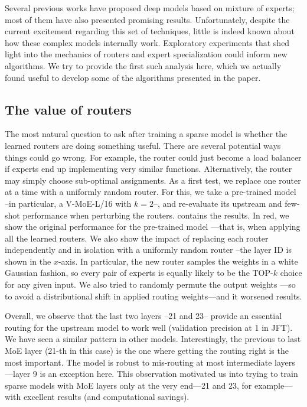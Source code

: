 \documentclass{article}
\newcommand{\abbv}{{V-MoE}}
\begin{document}
Several previous works have proposed deep models based on mixture of experts; most of them have also presented promising results.
Unfortunately, despite the current excitement regarding this set of techniques, little is indeed known about how these complex models internally work.
Exploratory experiments that shed light into the mechanics of routers and expert specialization could inform new algorithms.
We try to provide the first such analysis here, which we actually found useful to develop some of the algorithms presented in the paper.


\subsection{The value of routers}
\label{app_analysis_value_routers}
The most natural question to ask after training a sparse model is whether the learned routers are doing something useful.
There are several potential ways things could go wrong.
For example, the router could just become a load balancer if experts end up implementing very similar functions.
Alternatively, the router may simply choose sub-optimal assignments.
As a first test, we replace one router at a time with a uniformly random router.
For this, we take a pre-trained model --in particular, a \abbv{}-L/16 with $k=2$--, and re-evaluate its upstream and few-shot performance when perturbing the routers.
 contains the results.
In red, we show the original performance for the pre-trained model ---that is, when applying all the learned routers.
We also show the impact of replacing each router independently and in isolation with a uniformly random router --the layer ID is shown in the $x$-axis.
In particular, the new router samples the weights in a white Gaussian fashion, so every pair of experts is equally likely to be the TOP-$k$ choice for any given input. We also tried to randomly permute the output weights ---so to avoid a distributional shift in applied routing weights---and it worsened results.


Overall, we observe that the last two layers --21 and 23-- provide an essential routing for the upstream model to work well (validation precision at 1 in JFT).
We have seen a similar pattern in other models.
Interestingly, the previous to last MoE layer (21-th in this case) is the one where getting the routing right is the most important.
The model is robust to mis-routing at most intermediate layers---layer 9 is an exception here.
This observation motivated us into trying to train sparse models with MoE layers only at the very end---21 and 23, for example---with excellent results (and computational savings).
\end{document}
